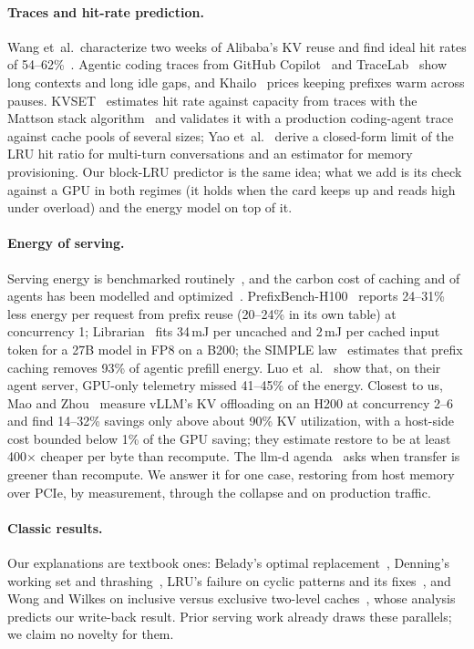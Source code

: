 \paragraph{Traces and hit-rate prediction.} Wang et~al.\ characterize two weeks of Alibaba's KV reuse and find ideal
hit rates of 54--62\%~\cite{wang2025kvcachewild}. Agentic coding traces from GitHub Copilot~\cite{copilot2026wild} and
TraceLab~\cite{tracelab2026} show long contexts and long idle gaps, and Khailo~\cite{keepalive2026} prices
keeping prefixes warm across pauses. KVSET~\cite{kvset2026} estimates hit rate against capacity from traces with the
Mattson stack algorithm~\cite{mattson1970evaluation} and validates it with a production coding-agent trace against cache pools of several sizes;
Yao et~al.~\cite{yao2026lrumeanfield} derive a closed-form limit of the LRU hit ratio for multi-turn conversations and an
estimator for memory provisioning. Our block-LRU
predictor is the same idea; what we add is its check against a GPU in both regimes (it holds when the card keeps up and
reads high under overload) and the energy model on top of it.

\paragraph{Energy of serving.} Serving energy is benchmarked routinely~\cite{chung2025mlenergy,pronk2025benchmarking,
zine2026attention,luo2026request}, and the carbon cost of caching and of agents has been modelled and optimized~\cite{greencache2025,agentdecarbonizer2026}.
PrefixBench-H100~\cite{shewale2026prefixbench} reports 24--31\% less energy per request from prefix reuse (20--24\% in its own table) at
concurrency 1; Librarian~\cite{cho2026librarian} fits 34\,mJ per uncached and 2\,mJ per cached input token for a 27B model
in FP8 on a B200; the SIMPLE law~\cite{cavagna2026simple} estimates that prefix caching removes 93\% of agentic prefill
energy. Luo et~al.~\cite{luo2026where} show that, on their agent server, GPU-only telemetry missed 41--45\% of the energy. Closest
to us, Mao and Zhou~\cite{mao2026offloading} measure vLLM's KV offloading on an H200 at concurrency 2--6 and find 14--32\%
savings only above about 90\% KV utilization, with a host-side cost bounded below 1\% of the GPU saving; they estimate restore
to be at least 400$\times$ cheaper per byte than recompute. The llm-d agenda~\cite{sisodia2026toward} asks when
transfer is greener than recompute. We answer it for one case, restoring from host memory over PCIe, by measurement, through the collapse and on production
traffic.

\paragraph{Classic results.} Our explanations are textbook ones: Belady's optimal replacement~\cite{belady1966study},
Denning's working set and thrashing~\cite{denning1968working,denning1968thrashing}, LRU's failure on cyclic patterns
and its fixes~\cite{jiang2002lirs,megiddo2003arc}, and Wong and Wilkes on inclusive versus exclusive two-level
caches~\cite{wong2002mycache}, whose analysis predicts our write-back result. Prior serving work already draws these parallels;
we claim no novelty for them.
